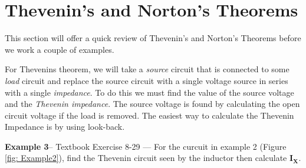 \documentclass{handout}
\begin{document}
\newpage
\clearpage
\pagebreak

\section{Thevenin's and Norton's Theorems}
This section will offer a quick review of Thevenin's and Norton's Theorems before we work a couple of examples.

For Thevenins theorem, we will take a {\em source} circuit that is connected to some {\em load} circuit and replace the source circuit with a single voltage source in series with a single {\em impedance}.  To do this we must find the value of the source voltage and the {\em Thevenin impedance}.  The source voltage is found by calculating the open circuit voltage if the load is removed.  The easiest way to calculate the Thevenin Impedance is by using look-back.

 \textbf{Example  3}-- Textbook Exercise 8-29 --- For the curcuit in example 2 (Figure \ref{fig: Example2}), find the  Thevenin circuit seen by the inductor then calculate $\mathbf{I_X}$.
\end{document}
